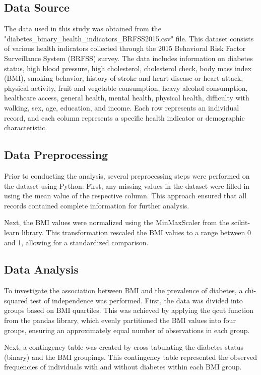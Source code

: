 \documentclass[11pt]{article}
\begin{document}
\subsection*{Data Source}
The data used in this study was obtained from the "diabetes\_binary\_health\_indicators\_BRFSS2015.csv" file. This dataset consists of various health indicators collected through the 2015 Behavioral Risk Factor Surveillance System (BRFSS) survey. The data includes information on diabetes status, high blood pressure, high cholesterol, cholesterol check, body mass index (BMI), smoking behavior, history of stroke and heart disease or heart attack, physical activity, fruit and vegetable consumption, heavy alcohol consumption, healthcare access, general health, mental health, physical health, difficulty with walking, sex, age, education, and income. Each row represents an individual record, and each column represents a specific health indicator or demographic characteristic.

\subsection*{Data Preprocessing}
Prior to conducting the analysis, several preprocessing steps were performed on the dataset using Python. First, any missing values in the dataset were filled in using the mean value of the respective column. This approach ensured that all records contained complete information for further analysis. 

Next, the BMI values were normalized using the MinMaxScaler from the scikit-learn library. This transformation rescaled the BMI values to a range between 0 and 1, allowing for a standardized comparison.

\subsection*{Data Analysis}
To investigate the association between BMI and the prevalence of diabetes, a chi-squared test of independence was performed. First, the data was divided into groups based on BMI quartiles. This was achieved by applying the qcut function from the pandas library, which evenly partitioned the BMI values into four groups, ensuring an approximately equal number of observations in each group.

Next, a contingency table was created by cross-tabulating the diabetes status (binary) and the BMI groupings. This contingency table represented the observed frequencies of individuals with and without diabetes within each BMI group.
\end{document}
